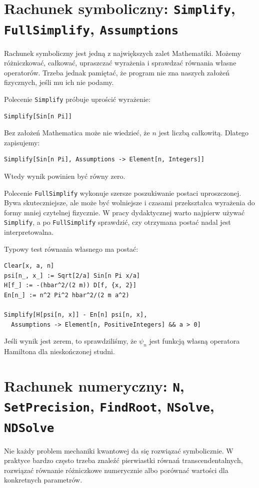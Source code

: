 \section{Rachunek symboliczny: \texttt{Simplify}, \texttt{FullSimplify}, \texttt{Assumptions}}

Rachunek symboliczny jest jedną z największych zalet Mathematiki. Możemy różniczkować, całkować, upraszczać wyrażenia i sprawdzać równania własne operatorów. Trzeba jednak pamiętać, że program nie zna naszych założeń fizycznych, jeśli mu ich nie podamy.

Polecenie \texttt{Simplify} próbuje uprościć wyrażenie:
\begin{verbatim}
Simplify[Sin[n Pi]]
\end{verbatim}
Bez założeń Mathematica może nie wiedzieć, że \(n\) jest liczbą całkowitą. Dlatego zapisujemy:
\begin{verbatim}
Simplify[Sin[n Pi], Assumptions -> Element[n, Integers]]
\end{verbatim}
Wtedy wynik powinien być równy zero.

Polecenie \texttt{FullSimplify} wykonuje szersze poszukiwanie postaci uproszczonej. Bywa skuteczniejsze, ale może być wolniejsze i czasami przekształca wyrażenia do formy mniej czytelnej fizycznie. W pracy dydaktycznej warto najpierw używać \texttt{Simplify}, a po \texttt{FullSimplify} sprawdzić, czy otrzymana postać nadal jest interpretowalna.

Typowy test równania własnego ma postać:
\begin{verbatim}
Clear[x, a, n]
psi[n_, x_] := Sqrt[2/a] Sin[n Pi x/a]
H[f_] := -(hbar^2/(2 m)) D[f, {x, 2}]
En[n_] := n^2 Pi^2 hbar^2/(2 m a^2)

Simplify[H[psi[n, x]] - En[n] psi[n, x],
  Assumptions -> Element[n, PositiveIntegers] && a > 0]
\end{verbatim}
Jeśli wynik jest zerem, to sprawdziliśmy, że \(\psi_n\) jest funkcją własną operatora Hamiltona dla nieskończonej studni.

\section{Rachunek numeryczny: \texttt{N}, \texttt{SetPrecision}, \texttt{FindRoot}, \texttt{NSolve}, \texttt{NDSolve}}

Nie każdy problem mechaniki kwantowej da się rozwiązać symbolicznie. W praktyce bardzo często trzeba znaleźć pierwiastki równań transcendentalnych, rozwiązać równanie różniczkowe numerycznie albo porównać wartości dla konkretnych parametrów.

